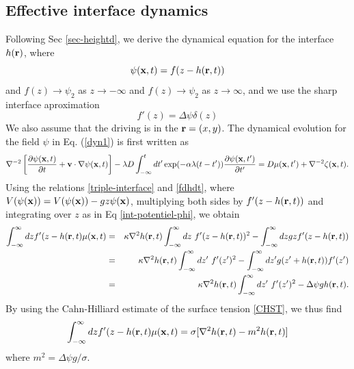 \subsection{Effective interface dynamics}
{\color{red}
Following Sec \ref{sec-heightd}, we derive the dynamical equation for the interface $h({\bf r})$, where
\begin{equation}
    \psi({\bf x},t) = f(z-h({\bf r},t))
    \label{dynamical-interface}
\end{equation}
and $f(z)\to \psi_2$ as $z\to -\infty$ and $f(z)\to \psi_2$ as  $z\to \infty$, and we use the sharp interface aproximation
\begin{equation}
    f'(z)=\Delta\psi \delta(z)
    \label{eqdelta}
\end{equation}
We also assume that the driving is in the ${\bf r}=(x,y)$. The dynamical evolution for the field $\psi$ in Eq. (\ref{dyn1}) is first written as
\begin{equation}
\nabla^{-2}\left[\frac{\partial \psi({\bf x},t)}{\partial t}+{\bf v}\cdot\nabla\psi({\bf x}, t)\right] -\lambda D\int_{-\infty}^t dt'
\exp(-\alpha\lambda(t-t')) \frac{\partial \psi({\bf x},t')}{\partial t'}=D  \mu({\bf x},t') + \nabla^{-2} \zeta({\bf x},t).\label{eqpsi}
\end{equation}
Using the relations \eqref{triple-interface} and \eqref{fdhdt}, where $V(\psi({\bf x})) = V(\psi({\bf x}))-gz \psi({\bf x})$, multiplying both sides by  $f'(z-h({\bf r},t))$ and integrating over $z$ as in Eq \eqref{int-potentiel-phi}, we obtain
\begin{eqnarray}
\int_{-\infty}^\infty dz f'(z-h({\bf r},t)\mu(\bx,t)&=& \kappa \nabla^2 h({\bf r},t)\int_{-\infty}^\infty dz\ f'(z-h({\bf r},t))^2 - \int_{-\infty}^\infty dz gz f'(z-h({\bf r},t))\nonumber \\&=&
\kappa\nabla^2 h({\bf r},t)\int_{-\infty}^\infty dz'\ f'(z')^2 - \int_{-\infty}^\infty dz' g(z' +h({\bf r},t)) f'(z')\nonumber \\
&=& \kappa\nabla^2 h({\bf r},t)\int_{-\infty}^\infty dz' \ f'(z')^2 -\Delta\psi g h({\bf r},t).
\end{eqnarray}
By using the Cahn-Hilliard estimate of the surface tension \eqref{CHST}, we thus find
\begin{equation}
    \int_{-\infty}^\infty dz f'(z-h({\bf r},t)\mu({\bf x},t) = \sigma[\nabla^2 h({\bf r},t)-m^2 h({\bf r},t)]
\end{equation}
where $m^2 = \Delta\psi g /\sigma$. 
}

